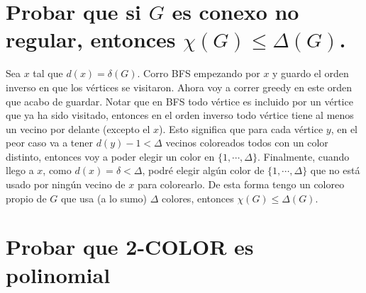 \documentclass[11pt, a4paper]{article}
\theoremstyle{definition}
\begin{document}
\section{Probar que si $G$ es conexo no regular, entonces $\chi(G)\leq \Delta(G)$.}

Sea \( x \) tal que \( d(x) = \delta(G) \). Corro BFS empezando por \( x \) y guardo el orden inverso en que los vértices se visitaron. Ahora voy a correr greedy en este orden que acabo de guardar. Notar que en BFS todo vértice es incluido por un vértice que ya ha sido visitado, entonces en el orden inverso todo vértice tiene al menos un vecino por delante (excepto el \( x \)). Esto significa que para cada vértice \( y \), en el peor caso va a tener \( d(y) - 1 < \Delta \) vecinos coloreados todos con un color distinto, entonces voy a poder elegir un color en \(\{1, \cdots, \Delta\}\). Finalmente, cuando llego a \( x \), como \( d(x) = \delta < \Delta \), podré elegir algún color de \(\{1, \cdots, \Delta\}\) que no está usado por ningún vecino de \( x \) para colorearlo. De esta forma tengo un coloreo propio de \( G \) que usa (a lo sumo) \(\Delta\) colores, entonces \(\chi(G) \leq \Delta(G)\).

\section{Probar que 2-COLOR es polinomial}
\end{document}
